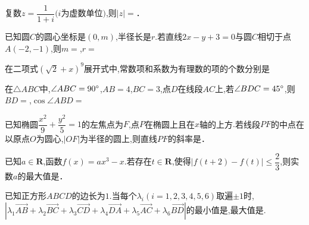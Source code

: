 \question[4] 复数$z= \dfrac {1}{1+i} (i$为虚数单位$)$,则$|z|=$．
\begin{solution}{4cm}

\end{solution}



\question[6] 已知圆$C$的圆心坐标是$(0 , m)$,半径长是$r.$若直线$2x-y+3=0$与圆$C$相切于点$A(-2 , -1)$,则$m=$,$r=$
\begin{solution}{4cm}

\end{solution}



\question[6] 在二项式$( \sqrt {2} +x) ^{9}$展开式中,常数项和系数为有理数的项的个数分别是
\begin{solution}{4cm}

\end{solution}



\question[6] 在$\triangle ABC$中,$ \angle ABC=90^{\small \circ}$,$AB=4$,$BC=3$,点$D$在线段$AC$上,若$ \angle BDC=45^{\small \circ}$,则$BD=$,$\cos \angle ABD=$
\begin{solution}{4cm}

\end{solution}



\question[4] 已知椭圆$ \dfrac {x^{2}}{9} + \dfrac {y^{2}}{5} =1$的左焦点为$F$,点$P$在椭圆上且在$x$轴的上方$.$若线段$PF$的中点在以原点$O$为圆心,$|OF|$为半径的圆上,则直线$PF$的斜率是．
\begin{solution}{4cm}

\end{solution}



\question[4] 已知$a \in \mathbf R$,函数$f(x)=ax ^{3} -x.$若存在$t \in \mathbf R$,使得$|f(t+2)-f(t)|\leqslant \dfrac {2}{3}$,则实数$a$的最大值是．
\begin{solution}{4cm}

\end{solution}



\question[6] 已知正方形$ABCD$的边长为$1.$当每个$ \lambda  _{i} (i=1 , 2 , 3 , 4 , 5 , 6)$取遍$ \pm 1$时,$| \lambda  _{1} \overrightarrow{AB} + \lambda  _{2} \overrightarrow{BC} + \lambda  _{3} \overrightarrow{CD} + \lambda  _{4} \overrightarrow{DA} + \lambda  _{5} \overrightarrow{AC} + \lambda  _{6} \overrightarrow{BD} |$的最小值是,最大值是.
\begin{solution}{4cm}

\end{solution}
